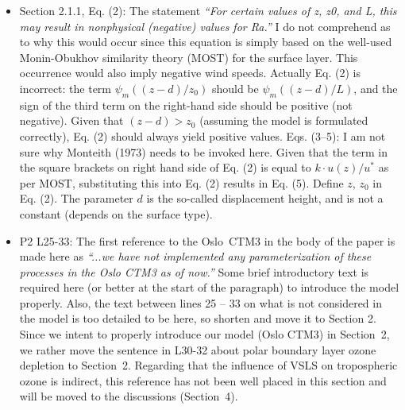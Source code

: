 \documentclass{scrartcl}
\begin{document}
\begin{itemize}
\item {\color{blue}  Section 2.1.1, Eq. (2): The statement \emph{“For certain values of z, z0, and L, this
    may result in nonphysical (negative) values for Ra.”} I do not comprehend as to why
  this would occur since this equation is simply based on the well-used Monin-Obukhov
  similarity theory (MOST) for the surface layer. This occurrence would also imply negative wind speeds.
  Actually Eq. (2) is incorrect: the term $\psi_m((z-d)/z_0)$ should be
  $\psi_m((z-d)/L)$, and the sign of the third term on the right-hand side should be positive
  (not negative). Given that $(z-d) > z_0$ (assuming the model is formulated correctly), Eq. (2) should always yield positive values.
  Eqs. (3--5): I am not sure why Monteith (1973) needs to be invoked here. Given that
  the term in the square brackets on right hand side of Eq. (2) is equal to $k\cdot u(z)/u^{*}$ as per
  MOST, substituting this into Eq. (2) results in Eq. (5).
  Define $z$, $z_0$ in Eq. (2). The parameter $d$ is the so-called displacement height, and is
  not a constant (depends on the surface type).}
  \emph{}

\item {\color{blue}  P2 L25-33: The first reference to the Oslo~CTM3 in the body of the paper is
  made here as \emph{“...we have not implemented any parameterization of these processes
    in the Oslo CTM3 as of now.”} Some brief introductory text is required here (or better at
  the start of the paragraph) to introduce the model properly. Also, the text between lines
  25 -- 33 on what is not considered in the model is too detailed to be here, so shorten
  and move it to Section 2.}
  Since we intent to properly introduce our model (Oslo CTM3) in Section~2, we rather
  move the sentence in L30-32 about polar boundary layer ozone depletion to Section~2.
  Regarding that the influence of VSLS on tropospheric ozone is indirect, this reference has not been
  well placed in this section and will be moved to the discussions (Section~4).


\end{itemize}
\end{document}
